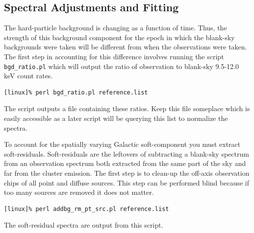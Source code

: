 \subsection{Spectral Adjustments and Fitting}

The hard-particle background is changing as a function of time. Thus,
the strength of this background component for the epoch in which the
blank-sky backgrounds were taken will be different from when the
observations were taken. The first step in accounting for this
difference involves running the script {\tt{bgd\_ratio.pl}} which will
output the ratio of observation to blank-sky 9.5-12.0 keV count rates.
\begin{verbatim}
[linux]% perl bgd_ratio.pl reference.list
\end{verbatim}
The script outputs a file containing these ratios. Keep this file
someplace which is easily accessible as a later script will be
querying this list to normalize the spectra.

To account for the spatially varying Galactic soft-component you must
extract soft-residuals. Soft-residuals are the leftovers of
subtracting a blank-sky spectrum from an observation spectrum both
extracted from the same part of the sky and far from the cluster
emission. The first step is to clean-up the off-axis observation chips
of all point and diffuse sources. This step can be performed blind
because if too many sources are removed it does not matter.
\begin{verbatim}
[linux]% perl addbg_rm_pt_src.pl reference.list
\end{verbatim}
The soft-residual spectra are output from this script.

